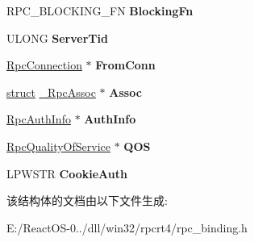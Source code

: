 \begin{DoxyCompactItemize}
R\+P\+C\+\_\+\+B\+L\+O\+C\+K\+I\+N\+G\+\_\+\+FN {\bfseries Blocking\+Fn}
\item 
\mbox{\label{struct___rpc_binding_a7f147850389b2c93309fe9de6bc279bd}} 
U\+L\+O\+NG {\bfseries Server\+Tid}
\item 
\mbox{\label{struct___rpc_binding_a6e8667910a6877ae91cc4bc08ad120a0}} 
\hyperlink{struct___rpc_connection}{Rpc\+Connection} $\ast$ {\bfseries From\+Conn}
\item 
\mbox{\label{struct___rpc_binding_adaa0e2a918886c2ea21f5e7ce8749eca}} 
\hyperlink{interfacestruct}{struct} \hyperlink{struct___rpc_assoc}{\+\_\+\+Rpc\+Assoc} $\ast$ {\bfseries Assoc}
\item 
\mbox{\label{struct___rpc_binding_a8a1ac88072722618043ced7a8e116a7b}} 
\hyperlink{struct___rpc_auth_info}{Rpc\+Auth\+Info} $\ast$ {\bfseries Auth\+Info}
\item 
\mbox{\label{struct___rpc_binding_ae9d2ca6700133345544f1b3f33908dae}} 
\hyperlink{struct___rpc_quality_of_service}{Rpc\+Quality\+Of\+Service} $\ast$ {\bfseries Q\+OS}
\item 
\mbox{\label{struct___rpc_binding_a5dd917a1a5d179de54e1b69ec6b805f0}} 
L\+P\+W\+S\+TR {\bfseries Cookie\+Auth}
\end{DoxyCompactItemize}


该结构体的文档由以下文件生成\+:\begin{DoxyCompactItemize}
\item 
E\+:/\+React\+O\+S-\/0../dll/win32/rpcrt4/rpc\+\_\+binding.\+h\end{DoxyCompactItemize}

